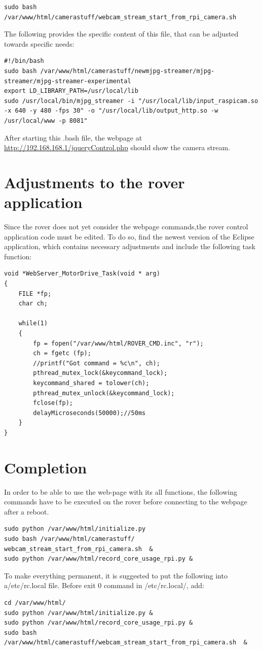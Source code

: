 \begin{lstlisting}
sudo bash /var/www/html/camerastuff/webcam_stream_start_from_rpi_camera.sh
\end{lstlisting}
The following provides the specific content of this file, that can be adjusted towards specific needs:
\begin{lstlisting}
#!/bin/bash
sudo bash /var/www/html/camerastuff/newmjpg-streamer/mjpg-streamer/mjpg-streamer-experimental 
export LD_LIBRARY_PATH=/usr/local/lib
sudo /usr/local/bin/mjpg_streamer -i "/usr/local/lib/input_raspicam.so -x 640 -y 480 -fps 30" -o "/usr/local/lib/output_http.so -w /usr/local/www -p 8081"
\end{lstlisting}
After starting this .bash file, the webpage at \url{http://192.168.168.1/jqueryControl.php} should show the camera stream.
\newpage
\section{Adjustments to the rover application}
Since the rover does not yet consider the webpage commands,the rover control application code must be edited. To do so, find the newest version of the Eclipse application, which contains necessary adjustments and include the following task function:
\begin{lstlisting}
void *WebServer_MotorDrive_Task(void * arg)
{
	FILE *fp;
	char ch;

	while(1)
	{
		fp = fopen("/var/www/html/ROVER_CMD.inc", "r");
		ch = fgetc (fp);
		//printf("Got command = %c\n", ch);
		pthread_mutex_lock(&keycommand_lock);
		keycommand_shared = tolower(ch);
		pthread_mutex_unlock(&keycommand_lock);
		fclose(fp);
		delayMicroseconds(50000);//50ms
	}
}
\end{lstlisting}
\section{Completion}
In order to be able to use the web-page with its all functions, the following commands have to be executed on the rover before connecting to the webpage after a reboot.
\begin{lstlisting}
sudo python /var/www/html/initialize.py
sudo bash /var/www/html/camerastuff/ webcam_stream_start_from_rpi_camera.sh  &
sudo python /var/www/html/record_core_usage_rpi.py &
\end{lstlisting}
To make everything permanent, it is suggested to put the following into a/etc/rc.local file. Before exit 0 command in /etc/rc.local/, add:
\begin{lstlisting}
cd /var/www/html/
sudo python /var/www/html/initialize.py &
sudo python /var/www/html/record_core_usage_rpi.py &
sudo bash /var/www/html/camerastuff/webcam_stream_start_from_rpi_camera.sh  &
\end{lstlisting}

